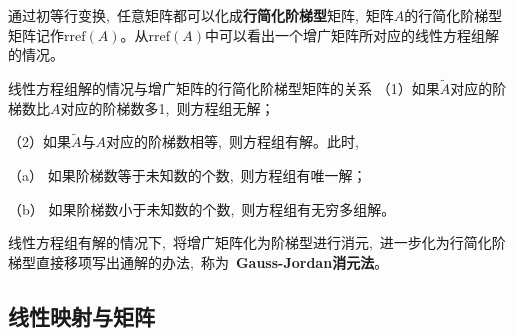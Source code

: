 \documentclass[10pt, a4paper, oneside, fontset=none]{ctexart}
\theoremstyle{plain}
\theoremstyle{definition}
\newcommand{\com}{,\,\,\,\:}
\newcommand{\di}[2][]{\begin{theo}{#1}\run #2\end{theo}}
\newcommand{\rref}{\mathrm{rref}}
\begin{document}
通过初等行变换\com 任意矩阵都可以化成\textbf{\color{bali!75!black}行简化阶梯型}矩阵\com 矩阵$A$的行简化阶梯型矩阵记作$\mathrm{rref}(A)$。从$\rref(A)$中可以看出一个增广矩阵所对应的线性方程组解的情况。
\di[线性方程组解的情况与增广矩阵的行简化阶梯型矩阵的关系]{
    （1）如果$\tilde{A}$对应的阶梯数比$A$对应的阶梯数多1\com 则方程组无解；

    （2）如果$\tilde{A}$与$A$对应的阶梯数相等\com 则方程组有解。此时\com 

    \qquad（a） 如果阶梯数等于未知数的个数\com 则方程组有唯一解；

    \qquad（b） 如果阶梯数小于未知数的个数\com 则方程组有无穷多组解。
}

线性方程组有解的情况下\com 将增广矩阵化为阶梯型进行消元\com 进一步化为行简化阶梯型直接移项写出通解的办法\com 称为~\textbf{\color{bali!75!black}Gauss-Jordan消元法}。

\subsection{线性映射与矩阵}
\end{document}
